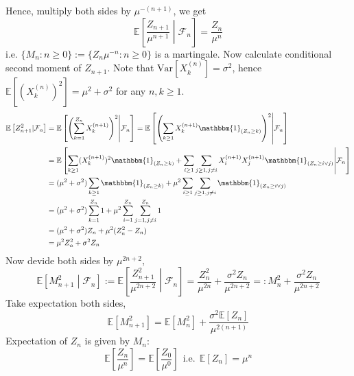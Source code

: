 \documentclass[a4paper,12pt,twoside]{book}
\begin{document}
\begin{itemize}
\begin{itemize}
	Hence, multiply both sides by $\mu^{-(n+1)}$, we get
	\begin{equation}
		\mathbb{E}\left[\frac{Z_{n+1}}{\mu^{n+1}}\middle|\mathcal{F}_n\right]=\frac{Z_n}{\mu^n}
	\end{equation}
	i.e. $\{M_n: n\geq 0\}:=\{Z_n\mu^{-n}: n\geq 0\}$ is a martingale.\newline
	Now calculate conditional second moment of $Z_{n+1}$. Note that $\mathrm{Var}\left[X_k^{(n)}\right]=\sigma^2$, hence $\mathbb{E}\left[(X_k^{(n)})^2\right]=\mu^2+\sigma^2$ for any $n,k\geq 1$.
	\begin{equation}
		\begin{split}
			\mathbb{E}\left[Z^2_{n+1}|\mathcal{F}_n\right]&=\mathbb{E}\left[\left(\sum_{k=1}^{Z_n}X_{k}^{(n+1)}\right)^2\middle|\mathcal{F}_n\right]=\mathbb{E}\left[\left(\sum_{k\geq 1}X_{k}^{(n+1)}\mathbbm{1}_{(Z_n\geq k)}\right)^2\middle|\mathcal{F}_n\right]\\
			&= \mathbb{E}\left[\sum_{k\geq 1}(X_k^{(n+1)})^2 \mathbbm{1}_{(Z_n\geq k)}+\sum_{i\geq 1}\sum_{j\geq 1, j\ne i}X_i^{(n+1)}X_j^{(n+1)}\mathbbm{1}_{(Z_n\geq i \vee j)}\middle|\mathcal{F}_n\right]\\
			&=(\mu^2 +\sigma^2)\sum_{k\geq 1}\mathbbm{1}_{(Z_n\geq k)}+\mu^2\sum_{i\geq 1}\sum_{j\geq 1, j\ne i}\mathbbm{1}_{(Z_n\geq i\vee j)}\\
			&= (\mu^2+\sigma^2)\sum_{k=1}^{Z_n}1+\mu^2\sum_{i=1}^{Z_n}\sum_{j=1, j\ne i}^{Z_n}1\\
			&=(\mu^2+\sigma^2)Z_n + \mu^2 (Z^2_n-Z_n)\\
			&=\mu^2Z_n^2 +\sigma^2 Z_n
		\end{split}
	\end{equation}
	Now devide both sides by $\mu^{2n+2}$,
	\begin{equation}
		\mathbb{E}\left[M_{n+1}^2\middle|\mathcal{F}_n\right]:=\mathbb{E}\left[\frac{Z_{n+1}^2}{\mu^{2n+2}}\middle|\mathcal{F}_n\right]=\frac{Z^2_n}{\mu^{2n}}+\frac{\sigma^2 Z_n}{\mu^{2n+2}}=:M^2_n+\frac{\sigma^2Z_n}{\mu^{2n+2}}
	\end{equation}
	Take expectation both sides,
	\begin{equation}
		\mathbb{E}\left[M_{n+1}^2\right]=\mathbb{E}\left[M^2_n\right]+\frac{\sigma^2 \mathbb{E}\left[Z_n\right]}{\mu^{2(n+1)}}
	\end{equation}
	Expectation of $Z_n$ is given by $M_n$:
	\begin{equation}
		\mathbb{E}\left[\frac{Z_n}{\mu^n}\right]=\mathbb{E}\left[\frac{Z_0}{\mu^0}\right]~~\text{i.e.}~~\mathbb{E}\left[Z_n\right]=\mu^n

\end{equation}
\end{itemize}
\end{itemize}
\end{document}
